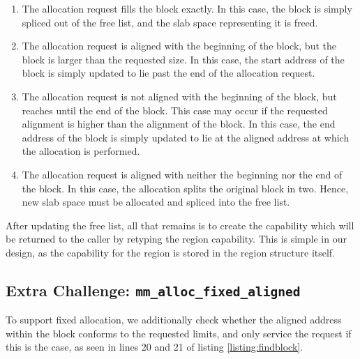 \begin{enumerate}
    \item The allocation request fills the block exactly. In this case, the block is simply spliced out of the free list, and the slab space representing it is freed.
    \item The allocation request is aligned with the beginning of the block, but the block is larger than the requested size. In this case, the start address of the block is simply updated to lie past the end of the allocation request.
    \item The allocation request is not aligned with the beginning of the block, but reaches until the end of the block. This case may occur if the requested alignment is higher than the alignment of the block. In this case, the end address of the block is simply updated to lie at the aligned address at which the allocation is performed.
    \item The allocation request is aligned with neither the beginning nor the end of the block. In this case, the allocation splits the original block in two. Hence, new slab space must be allocated and spliced into the free list.
\end{enumerate}

After updating the free list, all that remains is to create the capability which will be returned to the caller by retyping the region capability. This is simple in our design, as the capability for the region is stored in the region structure itself.

\subsection{Extra Challenge: \texttt{mm\_alloc\_fixed\_aligned}}
To support fixed allocation, we additionally check whether the aligned address within the block conforms to the requested limits, and only service the request if this is the case, as seen in lines 20 and 21 of listing \ref{listing:findblock}.

